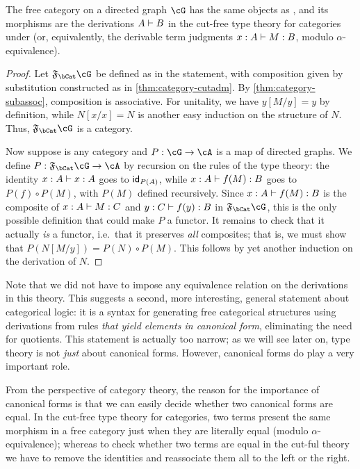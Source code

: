 \begin{thm}\label{thm:category-initial-2}
  The free category on a directed graph $\cG$ has the same objects as \cG, and its morphisms are the derivations $A\vdash B$ in the cut-free type theory for categories under \cG (or, equivalently, the derivable term judgments $x:A \vdash M:B$, modulo $\alpha$-equivalence).
\end{thm}
\begin{proof}
  Let $\F\bCat\cG$ be defined as in the statement, with composition given by substitution constructed as in \cref{thm:category-cutadm}.
  By \cref{thm:category-subassoc}, composition is associative.
  For unitality, we have $y[M/y] = y$ by definition, while $N[x/x] = N$ is another easy induction on the structure of $N$.
  Thus, $\F\bCat\cG$ is a category.

  Now suppose \cA is any category and $P:\cG\to\cA$ is a map of directed graphs.
  We define $P:\F\bCat\cG \to\cA$ by recursion on the rules of the type theory: the identity $x:A\vdash x:A$ goes to $\mathsf{id}_{P(A)}$, while $x:A\vdash f(M):B$ goes to $P(f) \circ P(M)$, with $P(M)$ defined recursively.
  Since $x:A\vdash f(M):B$ is the composite of $x:A\vdash M:C$ and $y:C\vdash f(y):B$ in $\F\bCat\cG$, this is the only possible definition that could make $P$ a functor.
  It remains to check that it actually \emph{is} a functor, i.e.\ that it preserves \emph{all} composites; that is, we must show that $P(N[M/y]) = P(N) \circ P(M)$.
  This follows by yet another induction on the derivation of $N$.
\end{proof}

Note that we did not have to impose any equivalence relation on the derivations in this theory.
This suggests a second, more interesting, general statement about categorical logic: it is
{a syntax for generating free categorical structures using derivations from rules}
\emph{that yield elements in canonical form}, eliminating the need for quotients.
This statement is actually too narrow; as we will see later on, type theory is not \emph{just} about canonical forms.
However, canonical forms do play a very important role.

From the perspective of category theory, the reason for the importance of canonical forms is that we can easily decide whether two canonical forms are equal.
In the cut-free type theory for categories, two terms present the same morphism in a free category just when they are literally equal (modulo $\alpha$-equivalence); whereas to check whether two terms are equal in the cut-ful theory we have to remove the identities and reassociate them all to the left or the right.

